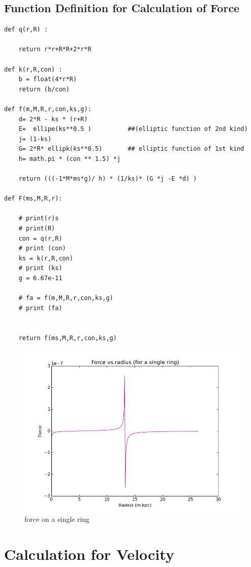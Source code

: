 \subsection{Function Definition for Calculation of Force}
\begin{verbatim}
def q(r,R) :

    return r*r+R*R+2*r*R

def k(r,R,con) :
    b = float(4*r*R)
    return (b/con)

def f(m,M,R,r,con,ks,g):
    d= 2*R - ks * (r+R)
    E=  ellipe(ks**0.5 )          ##(elliptic function of 2nd kind)
    j= (1-ks)
    G= 2*R* ellipk(ks**0.5)       ## elliptic function of 1st kind
    h= math.pi * (con ** 1.5) *j

    return (((-1*M*ms*g)/ h) * (1/ks)* (G *j -E *d) )

def F(ms,M,R,r):

    # print(r)s
    # print(R)
    con = q(r,R)
    # print (con)
    ks = k(r,R,con)
    # print (ks)
    g = 6.67e-11

    # fa = f(m,M,R,r,con,ks,g)
    # print (fa)


    return f(ms,M,R,r,con,ks,g)

\end{verbatim}

\begin{figure}[h]
\centering
\includegraphics[scale=0.5]{force41R} 
\caption{force on a single ring }
\end{figure}



\section{Calculation for Velocity }


